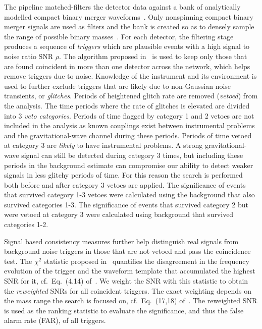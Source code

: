 \documentclass[12pt]{iopart}
\begin{document}
The pipeline matched-filters the detector data against a bank of
analytically modelled compact binary merger 
waveforms~\cite{Allen:2005fk,Babak:2012zx}. Only nonspinning compact binary 
merger signals are used as filters and the bank is created so as to densely 
sample the range of possible binary masses~\cite{Babak:2006ty}.
For each detector, the filtering stage produces 
a sequence of \textit{triggers} which are plausible events with a high 
signal to noise ratio SNR $\rho$. The algorithm proposed 
in~\cite{Robinson:2008un} is used to keep only those that are found coincident
in more than one detector across the network, which helps remove triggers due to 
noise. 
Knowledge of the instrument and its environment is used to further exclude
triggers that are likely due to non-Gaussian noise transients, or 
\textit{glitches}. Periods of heightened glitch rate are
removed (\emph{vetoed}) from the analysis. The time periods where the rate of 
glitches is elevated are divided into $3$ \emph{veto categories}. Periods of 
time flagged by category 1 and 2 vetoes are
not included in the analysis as known couplings exist between instrumental
problems and the gravitational-wave channel during these periods. Periods of
time vetoed at category 3 are \emph{likely} to have instrumental problems. A
strong gravitational-wave signal can still be detected during category 3 times,
but including these periods in the background estimate can compromise our
ability to detect weaker signals in less glitchy periods of time. For this
reason the search is performed both before and after category 3 vetoes are 
applied. The significance of events
that survived category 1-3 vetoes were calculated using the background that also
survived categories 1-3. The significance of events that survived category 2
but were vetoed at category 3 were calculated using background that survived
categories 1-2.

Signal based 
consistency measures further help distinguish real signals from background noise
triggers in those that are not vetoed and pass the coincidence test. 
The $\chi^{2}$ statistic proposed in~\cite{Allen:2004gu} quantifies the 
disagreement in the frequency evolution of 
the trigger and the waveform template that accumulated the highest SNR
for it, cf.\ Eq.~(4.14) of~\cite{Allen:2004gu}. We weight the SNR with this
statistic to obtain the \textit{reweighted} SNRs for all coincident triggers. 
The exact weighting depends on the mass range the search is focused on, cf.\
Eq.~(17,18) of~\cite{Babak:2012zx}. The reweighted SNR is used as the
ranking statistic to evaluate the significance, and thus the false alarm rate 
(FAR), of all triggers. 
\end{document}
